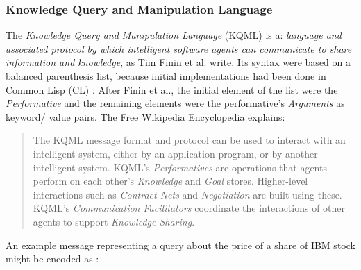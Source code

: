 %
%
%
%
%
%
%

\subsubsection{Knowledge Query and Manipulation Language}
\label{knowledge_query_and_manipulation_language_heading}

The \emph{Knowledge Query and Manipulation Language} (KQML) \cite{kqml} is a:
\textit{language and associated protocol by which intelligent software agents
can communicate to share information and knowledge}, as Tim Finin et al.
\cite{finin} write. Its syntax were based on a balanced parenthesis list,
because initial implementations had been done in Common Lisp (CL)
\cite{commonlisp}. After Finin et al., the initial element of the list were the
\emph{Performative} and the remaining elements were the performative's
\emph{Arguments} as keyword/ value pairs. The Free Wikipedia Encyclopedia
\cite{wikipedia} explains:

\begin{quote}
    The KQML message format and protocol can be used to interact with an
    intelligent system, either by an application program, or by another
    intelligent system. KQML's \emph{Performatives} are operations that agents
    perform on each other's \emph{Knowledge} and \emph{Goal} stores.
    Higher-level interactions such as \emph{Contract Nets} and
    \emph{Negotiation} are built using these. KQML's
    \emph{Communication Facilitators} coordinate the interactions of other
    agents to support \emph{Knowledge Sharing}.
\end{quote}

An example message representing a query about the price of a share of IBM stock
might be encoded as \cite{finin}:

